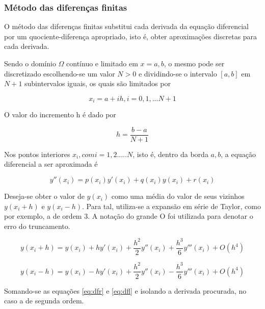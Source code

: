 \subsubsection{Método das diferenças finitas}

O método das diferenças finitas substitui cada derivada da equação diferencial por um quociente-diferença apropriado,
\citep[p. 684]{burden_faires}
isto é, obter aproximações discretas para cada derivada.

Sendo o domínio $ \Omega $ contínuo e limitado em $ x = {a, b} $, o mesmo pode ser discretizado escolhendo-se um valor $ N > 0 $ e dividindo-se o intervalo $ [a, b] $ em $ N + 1 $ subintervalos iguais, os quais são limitados por

\begin{equation}
  x_i = a + ih,  i = 0, 1, ... N+1
\end{equation}

O valor do incremento h é dado por 

\begin{equation}
  h = \frac{b-a}{N+1}
\end{equation}

Nos pontos interiores $ x_i , com i = 1, 2. .... N $, isto é, dentro da borda $ {a, b} $, a equação diferencial a ser aproximada é

\begin{equation}
    \label{eq:edo2}
    y''(x_i) = p(x_i)y'(x_i) + q(x_i)y(x_i) + r(x_i)
\end{equation}

Deseja-se obter o valor de $ y(x_i) $ como uma média do valor de seus vizinhos $ y(x_i + h) $ e $ y(x_i - h) $. Para tal, utiliza-se a expansão em série de Taylor, como por exemplo, a de ordem 3. A notação do grande O foi utilizada para denotar o erro do truncamento.

\begin{equation}
    \label{eq:dfr}
    y(x_i + h) = y(x_i) + hy'(x_i) + \frac{h^{2}}{2}y''(x_i) + \frac{h^{3}}{6}y'''(x_i) + O(h^{4})
\end{equation}

\begin{equation}
    \label{eq:dfl}
    y(x_i - h) = y(x_i) - hy'(x_i) + \frac{h^{2}}{2}y''(x_i) - \frac{h^{3}}{6}y'''(x_i) + O(h^{4})
\end{equation}

Somando-se as equações \ref{eq:dfr} e \ref{eq:dfl} e isolando a derivada procurada, no caso a de segunda ordem.

